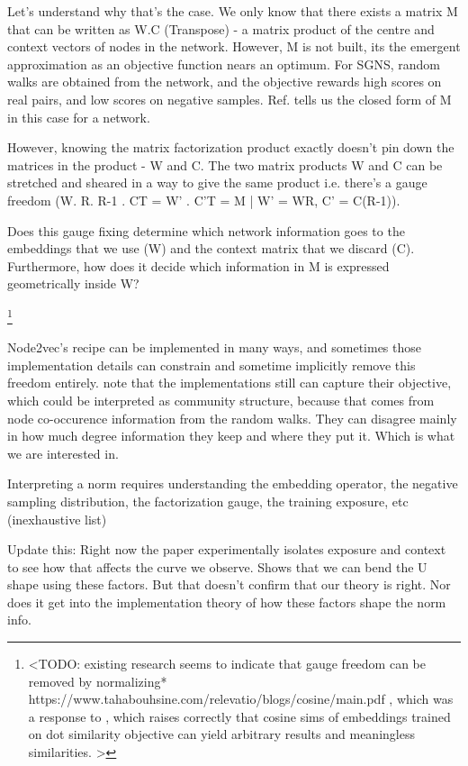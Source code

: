 \documentclass[aps,pre,reprint,superscriptaddress,longbibliography]{revtex4-2}
\begin{document}
Let's understand why that's the case. 
We only know that there exists a matrix M that can be written as W.C (Transpose) - a matrix product of the centre and context vectors of nodes in the network.
However, M is not built, its the emergent approximation as an objective function nears an optimum.
For SGNS, random walks are obtained from the network, and the objective rewards high scores on real pairs, and low scores on negative samples.
Ref. \cite{qiu2018network} tells us the closed form of M in this case for a network.

However, knowing the matrix factorization product exactly doesn't pin down the matrices in the product - W and C.
The two matrix products W and C can be stretched and sheared in a way to give the same product i.e. there's a gauge freedom (W. R. R-1 . CT = W' . C'T = M | W' = WR, C' = C(R-1)).

Does this gauge fixing determine which network information goes to the embeddings that we use (W) and the context matrix that we discard (C).
Furthermore, how does it decide which information in M is expressed geometrically inside W?

\footnote{<TODO: existing research seems to indicate that gauge freedom can be removed by normalizing* https://www.tahabouhsine.com/relevatio/blogs/cosine/main.pdf , which was a response to \cite{steck2024cosine}, which raises correctly that cosine sims of embeddings trained on dot similarity objective can yield arbitrary results and meaningless similarities. >}

Node2vec's recipe can be implemented in many ways, and sometimes those implementation details can constrain and sometime implicitly remove this freedom entirely. 
note that the implementations still can capture their objective, which could be interpreted as community structure, because that comes from node co-occurence information from the random walks. 
They can disagree mainly in how much degree information they keep and where they put it. 
Which is what we are interested in.

Interpreting a norm requires understanding the embedding operator, the negative sampling distribution, the factorization gauge, the training exposure, etc (inexhaustive list)

Update this: Right now the paper experimentally isolates exposure and context to see how that affects the curve we observe. Shows that we can bend the U shape using these factors. But that doesn't confirm that our theory is right. Nor does it get into the implementation theory of how these factors shape the norm info. 
\end{document}
